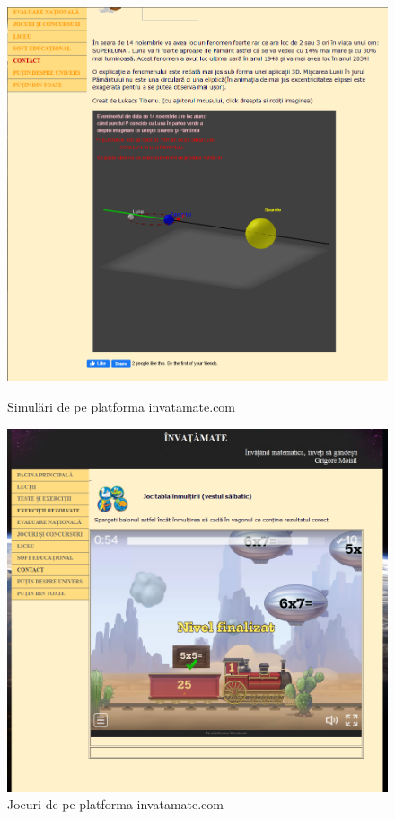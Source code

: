 \newpage
\begin{figure}[htb]
    \centering
    \begin{minipage}[b]{0.49\textwidth}
        \centering
        \includegraphics[width=\textwidth]{imgs/invatamatesimulare.png}
        \caption{Simulări de pe platforma invatamate.com}
        \label{fig:invatamatesimulare}
    \end{minipage}
    \hfill
    \begin{minipage}[b]{0.49\textwidth}
        \centering
        \includegraphics[width=\textwidth]{imgs/invatamatejoc.png}
        \caption{Jocuri de pe platforma invatamate.com}
        \label{fig:invatamatesjoc}
    \end{minipage}
\end{figure}


